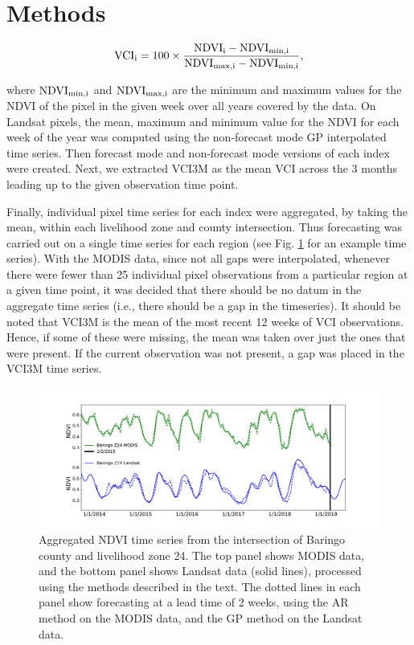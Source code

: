 \documentclass[review]{elsarticle}
\begin{document}
\section{Methods}
\begin{equation}
\rm{VCI}_i = 100 \times \frac{\rm{NDVI}_i - \rm{NDVI}_{min,i}}{ \rm{NDVI}_{max,i} - \rm{NDVI}_{min,i}},
\label{vci_eq}
\end{equation}

where $\rm{NDVI}_{min,i}$ and $\rm{NDVI}_{max,i}$ are the minimum and maximum values for the NDVI of the pixel in the given week over all years covered by the data. On Landsat pixels, the mean, maximum and minimum value for the NDVI for each week of the year
was computed using the non-forecast mode GP interpolated time series. Then forecast mode and non-forecast mode versions of each index were created. Next, we extracted VCI3M as the mean VCI across the 3 months leading up to the given observation time point.

Finally, individual pixel time series for each index were aggregated, by taking the mean, within each livelihood zone and county intersection. Thus forecasting was carried out on a single time series for each region (see Fig. \ref{fig:ndvi_lk} for an example time series). With the MODIS data, since not all gaps were interpolated, whenever there were fewer than 25 individual pixel observations from a particular region at a given time point, it was decided that there should be no datum in the aggregate time series (i.e., there should be a gap in the timeseries). It should be noted that VCI3M is the mean of the most recent 12 weeks of VCI observations. Hence, if some of these were missing, the mean was taken over just the ones that were present. If the current observation was not present, a gap was placed in the VCI3M time series.


\begin{figure}
	\centering
	\includegraphics[trim = 50mm 0mm 0mm 0mm,width=14.5 cm]{figures/NDVI2.pdf} 
	\caption{Aggregated NDVI time series from the intersection of Baringo county and livelihood zone 24. The top panel shows MODIS data, and the bottom panel shows Landsat data (solid lines), processed using the methods described in the text. The dotted lines in each panel show forecasting at a lead time of 2 weeks, using the AR method on the MODIS data, and the GP method on the Landsat data.} \label{fig:ndvi_lk}
\end{figure}
\end{document}
